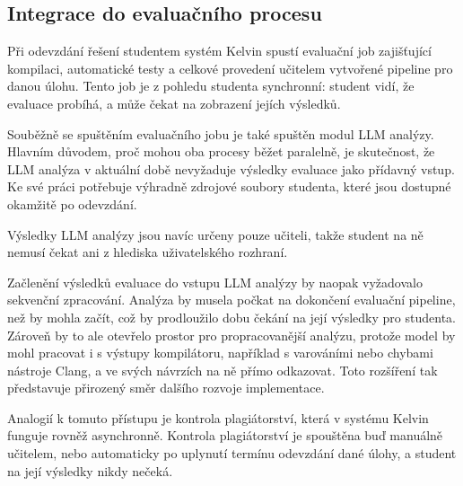 \subsection{Integrace do evaluačního procesu}
\label{subsec:implementation-pipeline}

Při odevzdání řešení studentem systém Kelvin spustí evaluační job zajišťující kompilaci, automatické testy a celkové provedení učitelem vytvořené pipeline pro danou úlohu.
Tento job je z pohledu studenta synchronní: student vidí, že evaluace probíhá, a může čekat na zobrazení jejích výsledků.

Souběžně se spuštěním evaluačního jobu je také spuštěn modul LLM analýzy.
Hlavním důvodem, proč mohou oba procesy běžet paralelně, je skutečnost, že LLM analýza v aktuální době nevyžaduje výsledky evaluace jako přídavný vstup.
Ke své práci potřebuje výhradně zdrojové soubory studenta, které jsou dostupné okamžitě po odevzdání.

Výsledky LLM analýzy jsou navíc určeny pouze učiteli, takže student na ně nemusí čekat ani z hlediska uživatelského rozhraní.

Začlenění výsledků evaluace do vstupu LLM analýzy by naopak vyžadovalo sekvenční zpracování.
Analýza by musela počkat na dokončení evaluační pipeline, než by mohla začít, což by prodloužilo dobu čekání na její výsledky pro studenta.
Zároveň by to ale otevřelo prostor pro propracovanější analýzu, protože model by mohl pracovat i s výstupy kompilátoru, například s varováními nebo chybami nástroje Clang, a ve svých návrzích na ně přímo odkazovat.
Toto rozšíření tak představuje přirozený směr dalšího rozvoje implementace.

Analogií k tomuto přístupu je kontrola plagiátorství, která v systému Kelvin funguje rovněž asynchronně.
Kontrola plagiátorství je spouštěna buď manuálně učitelem, nebo automaticky po uplynutí termínu odevzdání dané úlohy, a student na její výsledky nikdy nečeká.


\endinput
